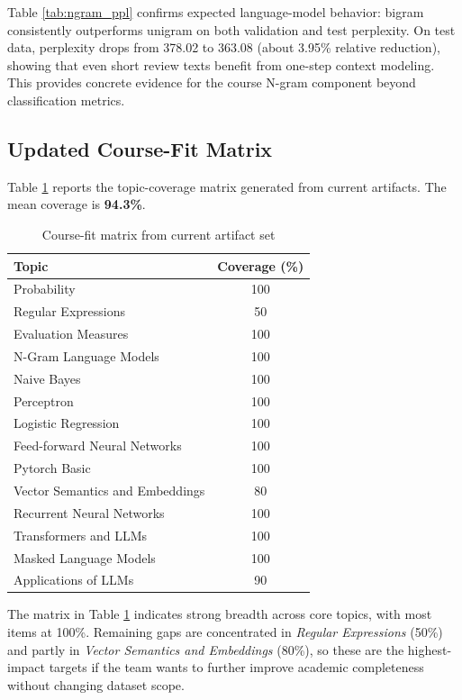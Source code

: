 \documentclass[12pt,a4paper]{article}
\begin{document}
Table \ref{tab:ngram_ppl} confirms expected language-model behavior: bigram consistently outperforms unigram on both validation and test perplexity. On test data, perplexity drops from 378.02 to 363.08 (about 3.95\% relative reduction), showing that even short review texts benefit from one-step context modeling. This provides concrete evidence for the course N-gram component beyond classification metrics.

\subsection{Updated Course-Fit Matrix}
Table \ref{tab:course_fit} reports the topic-coverage matrix generated from current artifacts. The mean coverage is \textbf{94.3\%}.

\begin{table}[H]
\centering
\caption{Course-fit matrix from current artifact set}
\label{tab:course_fit}
\begin{tabular}{lc}
\toprule
Topic & Coverage (\%) \\
\midrule
Probability & 100 \\
Regular Expressions & 50 \\
Evaluation Measures & 100 \\
N-Gram Language Models & 100 \\
Naive Bayes & 100 \\
Perceptron & 100 \\
Logistic Regression & 100 \\
Feed-forward Neural Networks & 100 \\
Pytorch Basic & 100 \\
Vector Semantics and Embeddings & 80 \\
Recurrent Neural Networks & 100 \\
Transformers and LLMs & 100 \\
Masked Language Models & 100 \\
Applications of LLMs & 90 \\
\bottomrule
\end{tabular}
\end{table}

The matrix in Table \ref{tab:course_fit} indicates strong breadth across core topics, with most items at 100\%. Remaining gaps are concentrated in \textit{Regular Expressions} (50\%) and partly in \textit{Vector Semantics and Embeddings} (80\%), so these are the highest-impact targets if the team wants to further improve academic completeness without changing dataset scope.
\end{document}
